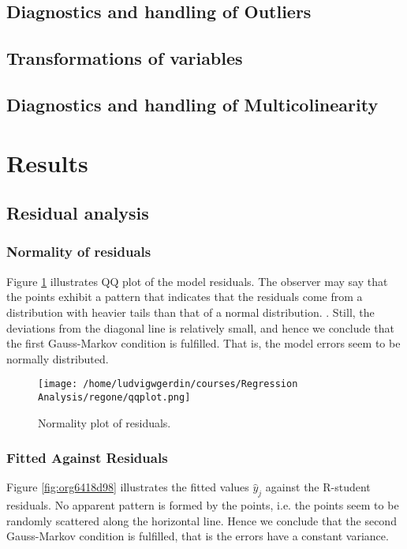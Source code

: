 \documentclass[11pt]{article}
\begin{document}
\subsection{Diagnostics and handling of Outliers}
\label{sec:org2ef79cf}
\subsection{Transformations of variables}
\label{sec:org558ce0e}
\subsection{Diagnostics and handling of Multicolinearity}
\label{sec:orge6de87f}
\section{Results}
\label{sec:org730b7bb}
\subsection{Residual analysis}
\label{sec:org24a5549}
\subsubsection{Normality of residuals}
\label{sec:orgc24be41}

Figure \ref{fig:orgb0e0070} illustrates QQ plot of the model residuals. The observer may say that the 
points exhibit a pattern that indicates that the residuals come from a distribution with heavier tails
than that of a normal distribution. 
\cite{Montgomery2012}. Still, the deviations from the diagonal line is relatively small, and hence
we conclude that the first Gauss-Markov condition is fulfilled. That is, the model errors seem to be 
normally distributed.

\begin{figure}[htbp]
\centering
\texttt{[image: /home/ludvigwgerdin/courses/Regression Analysis/regone/qqplot.png]}
\caption{\label{fig:orgb0e0070}
Normality plot of residuals.}
\end{figure}

\subsubsection{Fitted Against Residuals}
\label{sec:org9954f69}

Figure \ref{fig:org6418d98} illustrates the fitted values \(\hat y_j\) against the R-student residuals. No apparent 
pattern is formed by the points, i.e. the points seem to be randomly scattered along the horizontal line.
Hence we conclude that the second Gauss-Markov condition is fulfilled, that is the errors have a constant 
variance.
\end{document}

